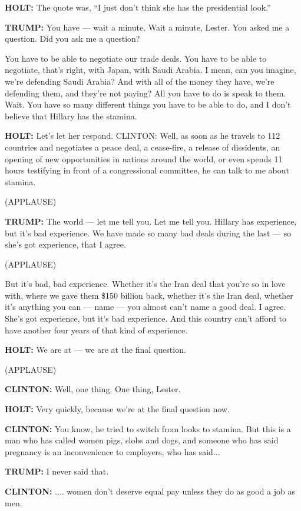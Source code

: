 \textbf{HOLT:} The quote was, ``I just don't think she has the
presidential look.''

\textbf{TRUMP:} You have --- wait a minute. Wait a minute, Lester. You
asked me a question. Did you ask me a question?

You have to be able to negotiate our trade deals. You have to be able to
negotiate, that's right, with Japan, with Saudi Arabia. I mean, can you
imagine, we're defending Saudi Arabia? And with all of the money they
have, we're defending them, and they're not paying? All you have to do
is speak to them. Wait. You have so many different things you have to be
able to do, and I don't believe that Hillary has the stamina.

\textbf{HOLT:} Let's let her respond. CLINTON: Well, as soon as he
travels to 112 countries and negotiates a peace deal, a cease-fire, a
release of dissidents, an opening of new opportunities in nations around
the world, or even spends 11 hours testifying in front of a
congressional committee, he can talk to me about stamina.

(APPLAUSE)

\textbf{TRUMP:} The world --- let me tell you. Let me tell you. Hillary
has experience, but it's bad experience. We have made so many bad deals
during the last --- so she's got experience, that I agree.

(APPLAUSE)

But it's bad, bad experience. Whether it's the Iran deal that you're so
in love with, where we gave them \$150 billion back, whether it's the
Iran deal, whether it's anything you can --- name --- you almost can't
name a good deal. I agree. She's got experience, but it's bad
experience. And this country can't afford to have another four years of
that kind of experience.

\textbf{HOLT:} We are at --- we are at the final question.

(APPLAUSE)

\textbf{CLINTON:} Well, one thing. One thing, Lester.

\textbf{HOLT:} Very quickly, because we're at the final question now.

\textbf{CLINTON:} You know, he tried to switch from looks to stamina.
But this is a man who has called women pigs, slobs and dogs, and someone
who has said pregnancy is an inconvenience to employers, who has said...

\textbf{TRUMP:} I never said that.

\textbf{CLINTON:} .... women don't deserve equal pay unless they do as
good a job as men.

